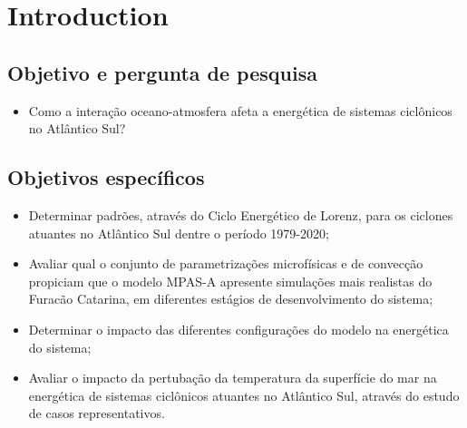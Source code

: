 \chapter{Introduction}
\label{intro}

\section{Objetivo e pergunta de pesquisa}

\begin{itemize}
    \item Como a interação oceano-atmosfera afeta a energética de sistemas ciclônicos no Atlântico Sul?
\end{itemize}

\section{Objetivos específicos}

\begin{itemize}
    \item Determinar padrões, através do Ciclo Energético de Lorenz, para os ciclones atuantes no Atlântico Sul dentre o período 1979-2020;
    \item Avaliar qual o conjunto de parametrizações microfísicas e de convecção propiciam que o modelo MPAS-A apresente simulações mais realistas do Furacão Catarina, em diferentes estágios de desenvolvimento do sistema;
    \item Determinar o impacto das diferentes configurações do modelo na energética do sistema;
    \item Avaliar o impacto da pertubação da temperatura da superfície do mar na energética de sistemas ciclônicos atuantes no Atlântico Sul, através do estudo de casos representativos.
\end{itemize}